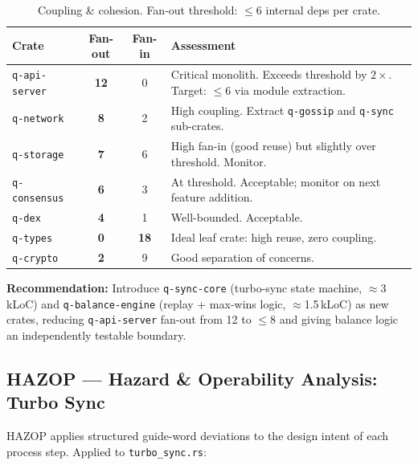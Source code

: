 \documentclass[12pt,a4paper]{article}
\begin{document}
\begin{table}[H]
\centering
\small
\begin{tabularx}{\linewidth}{lccX}
\toprule
\textbf{Crate} & \textbf{Fan-out} & \textbf{Fan-in} & \textbf{Assessment} \\
\midrule
\texttt{q-api-server} &
  \textcolor{qred}{\bfseries 12} & 0 &
  Critical monolith. Exceeds threshold by $2\times$. Target: $\leq$6 via module extraction. \\
\rowcolor{rowgray}
\texttt{q-network} &
  \textcolor{qorange}{\bfseries 8} & 2 &
  High coupling. Extract \texttt{q-gossip} and \texttt{q-sync} sub-crates. \\
\texttt{q-storage} &
  \textcolor{qorange}{\bfseries 7} & 6 &
  High fan-in (good reuse) but slightly over threshold. Monitor. \\
\rowcolor{rowgray}
\texttt{q-consensus} &
  \textcolor{qorange}{\bfseries 6} & 3 &
  At threshold. Acceptable; monitor on next feature addition. \\
\texttt{q-dex} &
  \textcolor{qgreen}{\bfseries 4} & 1 &
  Well-bounded. Acceptable. \\
\rowcolor{rowgray}
\texttt{q-types} &
  \textcolor{qgreen}{\bfseries 0} & \textcolor{qgreen}{\bfseries 18} &
  Ideal leaf crate: high reuse, zero coupling. \\
\texttt{q-crypto} &
  \textcolor{qgreen}{\bfseries 2} & 9 &
  Good separation of concerns. \\
\bottomrule
\end{tabularx}
\caption{Coupling \& cohesion. Fan-out threshold: $\leq$6 internal deps per crate.}
\end{table}

\textbf{Recommendation:} Introduce \texttt{q-sync-core}
(turbo-sync state machine, $\approx$3\,kLoC) and \texttt{q-balance-engine}
(replay + max-wins logic, $\approx$1.5\,kLoC) as new crates, reducing
\texttt{q-api-server} fan-out from 12 to $\leq$8 and giving balance logic an
independently testable boundary.

\subsection{HAZOP --- Hazard \& Operability Analysis: Turbo Sync}

HAZOP applies structured guide-word deviations to the design intent of each
process step. Applied to \texttt{turbo\_sync.rs}:
\end{document}
